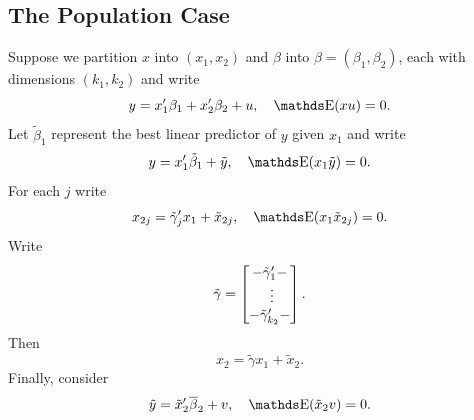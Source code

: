 \documentclass[letterpaper, 10pt]{article}
\begin{document}
\subsection{The Population Case}
Suppose we partition \(x\) into \((x_1, x_2)\) and \(\beta\) into \(\beta = (\beta_1, \beta_2)\), each with dimensions \((k_1, k_2)\) and write
\[
  y = x_1' \beta_1 + x_2' \beta_2 + u, \quad
  \E(xu) = 0.
\] 
Let \(\tilde{\beta}_1\) represent the best linear predictor of \(y\) given \(x_1\) and write
\[
  y = x_1' \tilde{\beta}_1 + \tilde{y}, \quad \E(x_1 \tilde{y}) = 0.
\]
For each \(j\) write
\[
  x_{2j} = \tilde{\gamma}_j' x_1 + \tilde{x}_{2j}, \quad \E(x_1 \tilde{x}_{2j}) = 0.
\]
Write
\[
  \tilde{\gamma}
  = \begin{bmatrix}
    - \tilde{\gamma}_1' - \\
    \ \vdots \\
    - \tilde{\gamma}_{k_2}' -
  \end{bmatrix}.
\]
Then
\[
  x_2 = \tilde{\gamma} x_1 + \tilde{x}_2.
\]
Finally, consider
\[
  \tilde{y} = \tilde{x}_2' \overline{\beta}_2 + v, \quad \E(\tilde{x}_2 v) = 0.
\]
\end{document}
